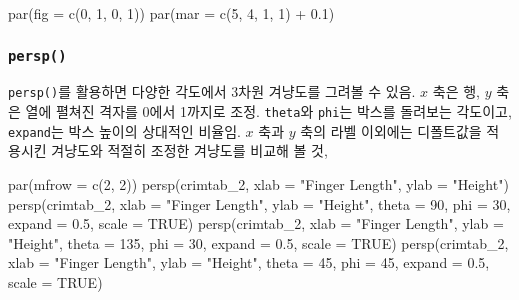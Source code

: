 \documentclass[
]{article}
\newenvironment{Shaded}{\begin{snugshade}}{\end{snugshade}}
\newcommand{\AttributeTok}[1]{\textcolor[rgb]{0.77,0.63,0.00}{#1}}
\newcommand{\ConstantTok}[1]{\textcolor[rgb]{0.00,0.00,0.00}{#1}}
\newcommand{\DecValTok}[1]{\textcolor[rgb]{0.00,0.00,0.81}{#1}}
\newcommand{\FloatTok}[1]{\textcolor[rgb]{0.00,0.00,0.81}{#1}}
\newcommand{\FunctionTok}[1]{\textcolor[rgb]{0.00,0.00,0.00}{#1}}
\newcommand{\NormalTok}[1]{#1}
\newcommand{\SpecialCharTok}[1]{\textcolor[rgb]{0.00,0.00,0.00}{#1}}
\newcommand{\StringTok}[1]{\textcolor[rgb]{0.31,0.60,0.02}{#1}}
\begin{document}
\begin{Shaded}
\begin{Highlighting}[]
\FunctionTok{par}\NormalTok{(}\AttributeTok{fig =} \FunctionTok{c}\NormalTok{(}\DecValTok{0}\NormalTok{, }\DecValTok{1}\NormalTok{, }\DecValTok{0}\NormalTok{, }\DecValTok{1}\NormalTok{))}
\FunctionTok{par}\NormalTok{(}\AttributeTok{mar =} \FunctionTok{c}\NormalTok{(}\DecValTok{5}\NormalTok{, }\DecValTok{4}\NormalTok{, }\DecValTok{1}\NormalTok{, }\DecValTok{1}\NormalTok{) }\SpecialCharTok{+} \FloatTok{0.1}\NormalTok{)}
\end{Highlighting}
\end{Shaded}

\hypertarget{persp}{%
\subsubsection{\texorpdfstring{\texttt{persp()}}{persp()}}\label{persp}}

\texttt{persp()}를 활용하면 다양한 각도에서 3차원 겨냥도를 그려볼 수
있음. \(x\) 축은 행, \(y\) 축은 열에 펼쳐진 격자를 0에서 1까지로 조정.
\texttt{theta}와 \texttt{phi}는 박스를 돌려보는 각도이고,
\texttt{expand}는 박스 높이의 상대적인 비율임. \(x\) 축과 \(y\) 축의
라벨 이외에는 디폴트값을 적용시킨 겨냥도와 적절히 조정한 겨냥도를 비교해
볼 것,

\begin{Shaded}
\begin{Highlighting}[]
\FunctionTok{par}\NormalTok{(}\AttributeTok{mfrow =} \FunctionTok{c}\NormalTok{(}\DecValTok{2}\NormalTok{, }\DecValTok{2}\NormalTok{))}
\FunctionTok{persp}\NormalTok{(crimtab\_2, }
      \AttributeTok{xlab =} \StringTok{"Finger Length"}\NormalTok{, }
      \AttributeTok{ylab =} \StringTok{"Height"}\NormalTok{)}
\FunctionTok{persp}\NormalTok{(crimtab\_2, }
      \AttributeTok{xlab =} \StringTok{"Finger Length"}\NormalTok{, }
      \AttributeTok{ylab =} \StringTok{"Height"}\NormalTok{, }
      \AttributeTok{theta =} \DecValTok{90}\NormalTok{, }
      \AttributeTok{phi =} \DecValTok{30}\NormalTok{, }
      \AttributeTok{expand =} \FloatTok{0.5}\NormalTok{, }
      \AttributeTok{scale =} \ConstantTok{TRUE}\NormalTok{)}
\FunctionTok{persp}\NormalTok{(crimtab\_2, }
      \AttributeTok{xlab =} \StringTok{"Finger Length"}\NormalTok{, }
      \AttributeTok{ylab =} \StringTok{"Height"}\NormalTok{, }
      \AttributeTok{theta =} \DecValTok{135}\NormalTok{, }
      \AttributeTok{phi =} \DecValTok{30}\NormalTok{, }
      \AttributeTok{expand =} \FloatTok{0.5}\NormalTok{, }
      \AttributeTok{scale =} \ConstantTok{TRUE}\NormalTok{)}
\FunctionTok{persp}\NormalTok{(crimtab\_2, }
      \AttributeTok{xlab =} \StringTok{"Finger Length"}\NormalTok{, }
      \AttributeTok{ylab =} \StringTok{"Height"}\NormalTok{, }
      \AttributeTok{theta =} \DecValTok{45}\NormalTok{, }
      \AttributeTok{phi =} \DecValTok{45}\NormalTok{, }
      \AttributeTok{expand =} \FloatTok{0.5}\NormalTok{, }
      \AttributeTok{scale =} \ConstantTok{TRUE}\NormalTok{)}
\end{Highlighting}
\end{Shaded}
\end{document}
